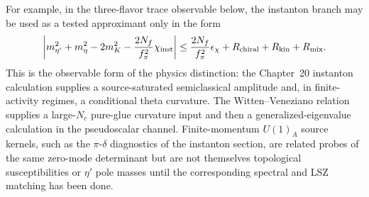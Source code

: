 \begin{controlledapproximation}
For example, in the three-flavor trace observable below, the instanton branch
may be used as a tested approximant only in the form
\begin{equation}
  \left|
    m_{\eta'}^2+m_\eta^2-2m_K^2
    -
    \frac{2N_f}{f_\pi^2}\chi_{\rm inst}
  \right|
  \le
  \frac{2N_f}{f_\pi^2}\epsilon_\chi
  +R_{\rm chiral}+R_{\rm kin}+R_{\rm mix}.
  \label{eq:instanton-wv-trace-comparison-budget}
\end{equation}
This is the observable form of the physics distinction: the Chapter~20
instanton calculation supplies a source-saturated semiclassical amplitude and,
in finite-activity regimes, a conditional theta curvature.  The
Witten--Veneziano relation supplies a large-\(N_c\) pure-glue curvature input
and then a generalized-eigenvalue calculation in the pseudoscalar channel.
Finite-momentum \(U(1)_A\) source kernels, such as the \(\pi\)-\(\delta\)
diagnostics of the instanton section, are related probes of the same
zero-mode determinant but are not themselves topological susceptibilities or
\(\eta'\) pole masses until the corresponding spectral and LSZ matching has
been done.
\end{controlledapproximation}

